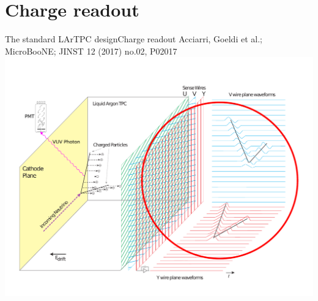 \documentclass[]{beamer}
\newcommand*{\uboone}{{MicroBooNE}}
\newcommand*{\lartpc}{{LArTPC}}
\begin{document}
\section{Charge readout}

\begin{frame}{The standard \lartpc{} design}{Charge readout}
	{\tiny Acciarri, Goeldi et al.; \uboone{}; JINST 12 (2017) no.02, P02017~\cite{uboone}}\\
	\centering
	\includegraphics[viewport=35 40 755 540, clip, height=.75\textheight]{defence/TPCprinciple_charge-ro}\\
\end{frame}
\end{document}
